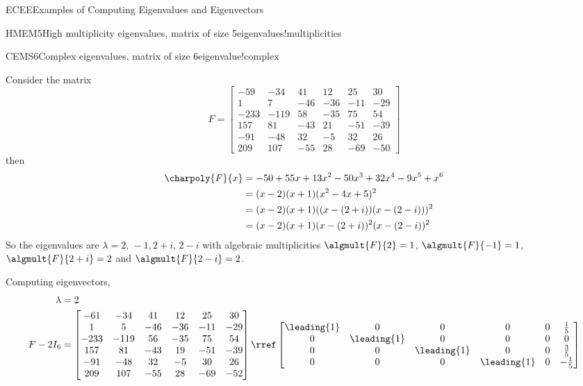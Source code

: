 \begin{subsect}{ECEE}{Examples of Computing Eigenvalues and Eigenvectors}
\begin{example}{HMEM5}{High multiplicity eigenvalues, matrix of size 5}{eigenvalues!multiplicities}
%
\end{example}
%
\begin{example}{CEMS6}{Complex eigenvalues, matrix of size 6}{eigenvalue!complex}
\begin{para}Consider the matrix
%
\begin{equation*}
F=
\begin{bmatrix}
-59 & -34 & 41 & 12 & 25 & 30\\
1 & 7 & -46 & -36 & -11 & -29\\
-233 & -119 & 58 & -35 & 75 & 54\\
157 & 81 & -43 & 21 & -51 & -39\\
-91 & -48 & 32 & -5 & 32 & 26\\
209 & 107 & -55 & 28 & -69 & -50
\end{bmatrix}
\end{equation*}
%
then
%
\begin{align*}
\charpoly{F}{x}&=-50+55x+13x^2-50x^3+32x^4-9x^5+x^6\\
 &=(x-2)(x+1)(x^2-4x+5)^2\\
 &=(x-2)(x+1)((x-(2+i))(x-(2-i)))^2\\
 &=(x-2)(x+1)(x-(2+i))^2(x-(2-i))^2\\
\end{align*}
%
So the eigenvalues are $\lambda=2,\,-1,2+i,\,2-i$ with algebraic multiplicities $\algmult{F}{2}=1$, $\algmult{F}{-1}=1$, $\algmult{F}{2+i}=2$ and $\algmult{F}{2-i}=2$.\end{para}
%
\begin{para}Computing eigenvectors,
%
\begin{align*}
\lambda&=2\\
F-2I_6&=
\begin{bmatrix}
-61 & -34 & 41 & 12 & 25 & 30\\
1 & 5 & -46 & -36 & -11 & -29\\
-233 & -119 & 56 & -35 & 75 & 54\\
157 & 81 & -43 & 19 & -51 & -39\\
-91 & -48 & 32 & -5 & 30 & 26\\
209 & 107 & -55 & 28 & -69 & -52
\end{bmatrix}
\rref
\begin{bmatrix}
\leading{1} & 0 & 0 & 0 & 0 & \frac{1}{5}\\
0 & \leading{1} & 0 & 0 & 0 & 0\\
0 & 0 & \leading{1} & 0 & 0 & \frac{3}{5}\\
0 & 0 & 0 & \leading{1} & 0 & -\frac{1}{5}\\

\end{bmatrix}
\end{align*}
\end{para}
\end{example}
\end{subsect}
